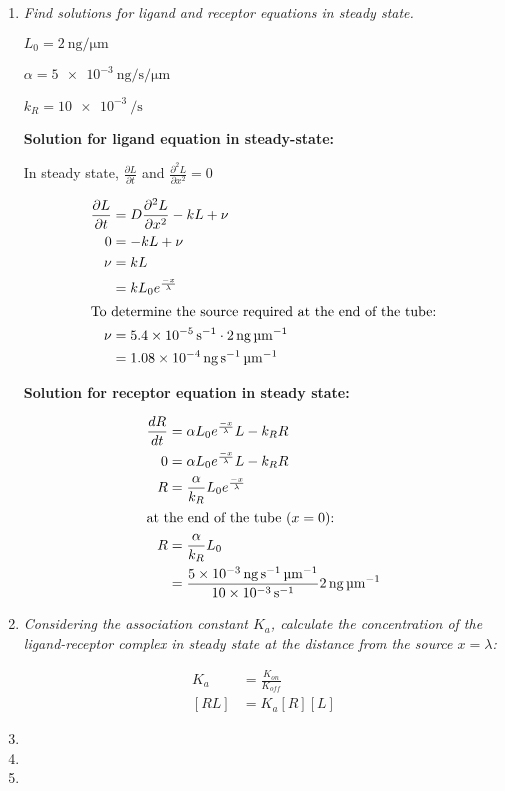 \documentclass{article} %
\begin{document}
\begin{enumerate}
  \item \textit{Find solutions for ligand and receptor equations in steady state.}

      $L_0=\SI{2}{\nano\g\per\micro\m}$

      $\alpha = \SI{5e-3}{\nano\g\per\s\per\micro\m}$

      $k_R= \SI{10e-3}{\per\s}$


      \textbf{Solution for ligand equation in steady-state:}

      In steady state, $\frac{\partial L}{\partial t}$ and $\frac{\partial^2 L}{\partial x^2} = 0$  

      \begin{align*}
        \frac{\partial L }{\partial t} &= D\frac{\partial^2 L}{\partial x^2}-kL+\nu \\
        0 &=-kL + \nu \\
        \nu &= kL \\
        &= k L_0e^{\frac{-x}{\lambda}} \\
          \intertext{To determine the source required at the end of the tube:}
        \nu &= \SI{5.4e-5}{\per\s} \cdot\SI{2}{\nano\g\per\micro\m} \\
              &= \SI{1.08e-4}{\nano\g\per\s\per\micro\m}
      \end{align*}

      \textbf{Solution for receptor equation in steady state:}

      \begin{align*}
        \frac{dR}{dt} &= \alpha L_0 e^{\frac{-x}{\lambda}} L-k_R R \\
        0 &= \alpha L_0 e^{\frac{-x}{\lambda}} L-k_R R \\
        R &= \frac{\alpha}{k_R} L_0e^{\frac{-x}{\lambda}} \\
        \intertext{at the end of the tube ($x=0$):}
        R &= \frac{\alpha}{k_R}L_0 \\
                      &= \frac{\SI{5e-3}{\nano\gram\per\s\per\micro\m}}{\SI{10e-3}{\per\s}} \SI{2}{\nano\gram\per\micro\m} \\
      \end{align*}
        
    \item \textit{Considering the association constant $K_a$, calculate the concentration of the ligand-receptor complex in steady state at the distance from the source $x=\lambda$:}

      \begin{align*}
        K_a &= \frac{K_{on}}{K_{off}} \\
        [RL] &= K_a[R][L] 
      \end{align*}
    \item 
    \item 
    \item 
\end{enumerate}
\end{document}
